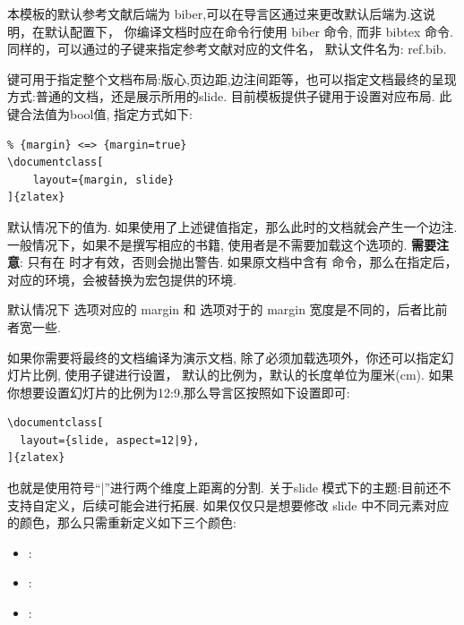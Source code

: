 本模板的默认参考文献后端为 {biber},可以在导言区通过来更改默认后端为.这说明，在默认配置下，
你编译文档时应在命令行使用 {biber} 命令, 而非 {bibtex} 命令. 同样的，可以通过的子键来指定参考文献对应的文件名，
默认文件名为: {ref.bib}. 

\label{sec:slide-mode}
 键可用于指定整个文档布局:版心,页边距,边注间距等，也可以指定文档最终的呈现方式:普通的文档，还是展示所用的slide.
目前模板提供子键用于设置对应布局. 此键合法值为bool值, 指定方式如下:
\begin{verbatim}
% {margin} <=> {margin=true}
\documentclass[
    layout={margin, slide}
]{zlatex}
\end{verbatim}

默认情况下的值为. 如果使用了上述键值指定，那么此时的文档就会产生一个边注. 一般情况下，如果不是撰写相应的书籍,
使用者是不需要加载这个选项的. \textbf{需要注意}: 只有在 时才有效，否则会抛出警告. 如果原文档中含有\cmd{\marginpar}
命令，那么在指定后，对应的\cmd{\marginpar}环境，会被替换为宏包提供的环境.

\begin{remark}
默认情况下  选项对应的 margin 和  选项对于的 margin 宽度是不同的，后者比前者宽一些.
\end{remark}

如果你需要将最终的文档编译为演示文档, 除了必须加载选项外，你还可以指定幻灯片比例, 使用子键进行设置，
默认的比例为，默认的长度单位为厘米(cm). 如果你想要设置幻灯片的比例为12:9,那么导言区按照如下设置即可:
\begin{verbatim}
\documentclass[
  layout={slide, aspect=12|9},
]{zlatex}
\end{verbatim}

也就是使用符号``|''进行两个维度上距离的分割. 关于slide 模式下的主题:目前还不支持自定义，后续可能会进行拓展. 如果仅仅只是想要修改
slide 中不同元素对应的颜色，那么只需重新定义如下三个颜色:
\begin{itemize}
  \item {}: 
  \item {}: 
  \item {}: 
\end{itemize} 

